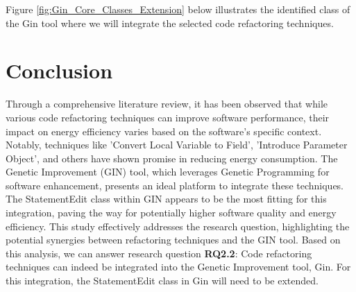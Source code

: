 \vspace{1em}
Figure \ref{fig:Gin_Core_Classes_Extension} below illustrates the identified class of the Gin tool where we will integrate the selected code refactoring techniques.



\section{Conclusion}
Through a comprehensive literature review, it has been observed that while various code refactoring techniques can improve software performance, their impact on energy efficiency varies based on the software's specific context. Notably, techniques like 'Convert Local Variable to Field', 'Introduce Parameter Object', and others have shown promise in reducing energy consumption. The Genetic Improvement (GIN) tool, which leverages Genetic Programming for software enhancement, presents an ideal platform to integrate these techniques. The StatementEdit class within GIN appears to be the most fitting for this integration, paving the way for potentially higher software quality and energy efficiency. This study effectively addresses the research question, highlighting the potential synergies between refactoring techniques and the GIN tool. Based on this analysis, we can answer research question \textbf{RQ2.2}: Code refactoring techniques can indeed be integrated into the Genetic Improvement tool, Gin. For this integration, the StatementEdit class in Gin will need to be extended. 
